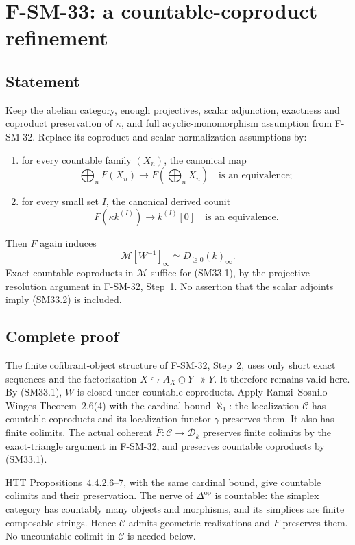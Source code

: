 \section{F-SM-33: a countable-coproduct refinement}

\subsection{Statement}
Keep the abelian category, enough projectives, scalar adjunction,
exactness and coproduct preservation of \(\kappa\), and full
acyclic-monomorphism assumption from F-SM-32.  Replace its
coproduct and scalar-normalization assumptions by:
\begin{enumerate}
\item for every countable family \((X_n)\), the canonical map
\[
       \bigoplus_n F(X_n)\longrightarrow F(\bigoplus_nX_n)
                         \quad\text{is an equivalence};       \tag{SM33.1}
\]
\item for every small set \(I\), the canonical derived counit
\[
                  F(\kappa k^{(I)})\longrightarrow k^{(I)}[0]
                         \quad\text{is an equivalence}.       \tag{SM33.2}
\]
\end{enumerate}
Then \(F\) again induces
\[
                   \mathcal M[W^{-1}]_\infty\simeq D_{\ge0}(k)_\infty.
                                                               \tag{SM33.3}
\]
Exact countable coproducts in \(\mathcal M\) suffice for
(SM33.1), by the projective-resolution argument in
F-SM-32, Step~1.  No assertion that the scalar adjoints imply
(SM33.2) is included.

\subsection{Complete proof}
The finite cofibrant-object structure of F-SM-32, Step~2,
uses only short exact sequences and the factorization
\(X\hookrightarrow A_X\oplus Y\twoheadrightarrow Y\).
It therefore remains valid here.  By (SM33.1), \(W\) is
closed under countable coproducts.  Apply
Ramzi--Sosnilo--Winges Theorem~2.6(4) with the cardinal bound
\(\aleph_1\): the localization \(\mathcal C\) has countable
coproducts and its localization functor \(\gamma\) preserves
them.  It also has finite colimits.  The actual coherent
\(\overline F:\mathcal C\to\mathcal D_k\) preserves finite
colimits by the exact-triangle argument in F-SM-32, and
preserves countable coproducts by (SM33.1).

HTT Propositions~4.4.2.6--7, with the same cardinal bound,
give countable colimits and their preservation.  The nerve
of \(\Delta^{\mathrm{op}}\) is countable: the simplex
category has countably many objects and morphisms, and its
simplices are finite composable strings.  Hence
\(\mathcal C\) admits geometric realizations and
\(\overline F\) preserves them.  No uncountable colimit in
\(\mathcal C\) is needed below.


